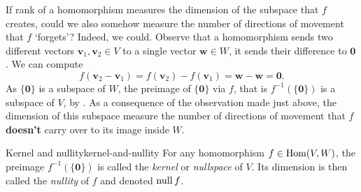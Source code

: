 If rank of a homomorphism measures the dimension of the subspace that $f$
creates, could we also somehow measure the number of directions of movement that
$f$ `forgets'? Indeed, we could. Observe that a homomorphism sends two different
vectors $\mathbf{v}_1,\mathbf{v}_2 \in V$ to a single vector $\mathbf{w} \in W$,
it sends their difference to $\mathbf{0}$. We can compute
\[
 f(\mathbf{v}_2 - \mathbf{v}_1) = f(\mathbf{v}_2) - f(\mathbf{v}_1) = \mathbf{w}
 - \mathbf{w} = \mathbf{0}.
\]
As $\{\mathbf{0}\}$ is a subspace of $W$, the preimage of $\{\mathbf{0}\}$ via
$f$, that is $f^{-1}(\{\mathbf{0}\})$ is a subspace of $V$, by
. As a consequence of the observation made just
above, the dimension of this subspace measure the number of directions of
movement that $f$ \textbf{doesn't} carry over to its image inside $W$.

\begin{definition}{Kernel and nullity}{kernel-and-nullity}
 For any homomorphism $f \in \operatorname{Hom}(V,W)$, the preimage $f^{-1}(\{\mathbf{0}\})$
 is called the \emph{kernel} or \emph{nullspace} of $V$. Its dimension is then
 called the \emph{nullity} of $f$ and denoted $\operatorname{null} f$.
\end{definition}

